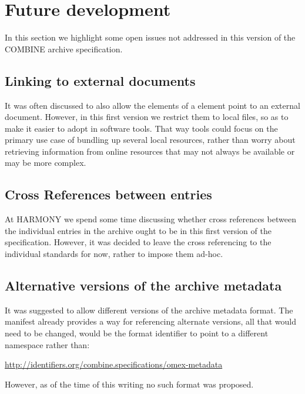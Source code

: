 
\section{Future development}
\label{future}
In this section we highlight some open issues not addressed in this 
version of the COMBINE archive specification. 


\subsection{Linking to external documents}
It was often discussed to also allow the  elements of a 
\Content element point to an external document. However, in this first 
version we restrict them to local files, so as to make it easier to 
adopt in software tools. That way tools could focus on the primary use 
case of bundling up several local resources, rather than worry about 
retrieving information from online resources that may not always be 
available or may be more complex.

\subsection{Cross References between entries}
At HARMONY we spend some time discussing whether cross references 
between the individual entries in the archive ought to be in this first 
version of the specification. However, it was decided to leave the cross 
referencing to the individual standards for now, rather to impose them 
ad-hoc. 

\subsection{Alternative versions of the archive metadata}
It was suggested to allow different versions of the archive metadata 
format. The manifest already provides a way for referencing alternate 
versions, all that would need to be changed, would be the format 
identifier to point to a different namespace rather than: 


\url{http://identifiers.org/combine.specifications/omex-metadata}

However, as of the time of this writing no such format was proposed.
